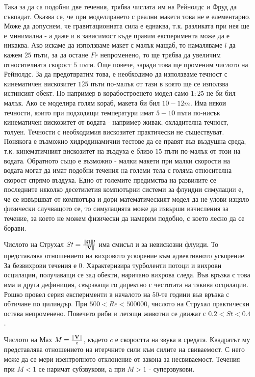 Така за да са подобни две течения, трябва числата им на Рейнолдс и Фруд да съвпадат. 
Оказва се, че при моделирането с реални макети това не е елементарно. 
Може да допуснем, че гравитационната сила е еднаква, т.к. разликата при нея ще е минимална - а даже и в зависимост къде правим експеримента може да е никаква.
Ако искаме да използваме макет с малък мащаб, то намаляваме $l$ да кажем $25$ пъти, за да остане $Fr$ непроменено, то ще трябва да увеличим относителната скорост $5$ пъти.
Още повече, заради това ще променим числото на Рейнолдс. За да предотвратим това, е необходимо да използваме течност с кинематичен вискозитет $125$ пъти по-малък от тази в която ще се използва истинсият обект.
Но например в корабостроенето модел само $1:25$ не би бил малък. Ако се моделира голям кораб, макета би бил $10-12m$.
Има някои течности, които при подходящи температури имат $5-10$ пъти по-нисък кинематичен вискозитет от водата - например живак, охладителна течност, толуен.
Течности с необходимия вискозитет практически не съществуват.
Понякога е възможно хидродинамични тестове да се правят във въздушна среда, т.к. кинематичният вискозитет на въздуха е близо $15$ пъти по-малък от този на водата.
Обратното също е възможно - малки макети при малки скорости на водата могат да имат подобни течения на големи тела с голяма относителна скорост спрямо въздуха.
Едно от големите предимства на развилите се последните няколко десетилетия компютърни системи за флуидни симулации е, че се извършват от компютъра и дори математическият модел да не улови изцяло физически случващото се, то симулацията може да извърши изчисления за течение, за което не можем физически да намерим подобно, с което лесно да се борави.

Числото на Струхал $St = \frac{\norm{\bm\Omega} l}{\norm{\mathbf{V}}}$ има смисъл и за невискозни флуиди.
То представлява отношението на вихровото ускорение към адвективното ускорение.
За безвихрови течения е $0$. Характеризира турболенти потоци и вихрови осцилации, получаващи се зад обекти, наричано вихрова следа.
Във връзка с това има и друга дефиниция, свързваща го директно с честотата на такива осцилации.
Рошко провел серия експерименти в началото на $50$-те години във връзка с обтичане по цилиндър.
При $500 < Re < 500 000$, числото на Струхал практически остава непроменено.
Повечето риби и летящи животни се движат с $0.2 < St < 0.4$.

Числото на Мах $M = \frac{\norm{\mathbf{V}}}{c}$, където $c$ е скоростта на звука в средата.
Квадратът му представлява отношението на итерчните сили към силите на свиваемост.
С него може да се мери изентропното отклонение от закона за несвиваемост.
Течения при $M < 1$ се наричат субзвукови, а при $M > 1$ - суперзвукови.

